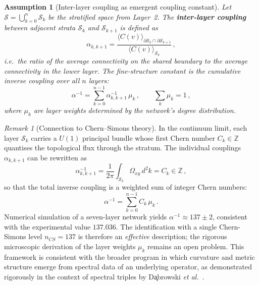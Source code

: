 \documentclass[11pt,a4paper]{article}
\newtheorem{assumption}[theorem]{Assumption}
\theoremstyle{definition}
\theoremstyle{remark}
\newtheorem{remark}{Remark}[section]
\begin{document}
\begin{assumption}[Inter-layer coupling as emergent coupling constant]\label{ass:interlayer}
Let $\mathcal{S}=\bigcup_{k=0}^{n}\mathcal{S}_{k}$ be the stratified space
from Layer~2.  The \textbf{inter-layer coupling} between adjacent strata
$\mathcal{S}_{k}$ and $\mathcal{S}_{k+1}$ is defined as
\begin{equation}\label{eq:interlayer}
\alpha_{k,k+1}
=\frac{\langle C(v)\rangle_{\partial\mathcal{S}_{k}\cap\partial\mathcal{S}_{k+1}}}
      {\langle C(v)\rangle_{\mathcal{S}_{k}}}\,,
\end{equation}
i.e.\ the ratio of the average connectivity on the shared boundary to the
average connectivity in the lower layer.  The fine-structure constant is the
cumulative inverse coupling over all $n$ layers:
\begin{equation}\label{eq:alpha-cumulative}
\alpha^{-1}=\sum_{k=0}^{n-1}\alpha_{k,k+1}^{-1}\,\mu_{k}\,,
\qquad
\sum_{k}\mu_{k}=1\,,
\end{equation}
where $\mu_{k}$ are layer weights determined by the network's degree
distribution.
\end{assumption}

\begin{remark}[Connection to Chern--Simons theory]
In the continuum limit, each layer $\mathcal{S}_{k}$ carries a $U(1)$
principal bundle whose first Chern number $C_{k}\in\mathbb{Z}$ quantises the
topological flux through the stratum.  The individual couplings
$\alpha_{k,k+1}$ can be rewritten as
\begin{equation}\label{eq:cs-layer}
\alpha_{k,k+1}^{-1}=\frac{1}{2\pi}\int_{\mathcal{S}_{k}}\Omega_{xy}\,d^{2}k
=C_{k}\in\mathbb{Z}\,,
\end{equation}
so that the total inverse coupling is a weighted sum of integer Chern numbers:
\begin{equation}\label{eq:cs-total}
\alpha^{-1}=\sum_{k=0}^{n-1}C_{k}\,\mu_{k}\,.
\end{equation}
Numerical simulation of a seven-layer network yields
$\alpha^{-1}\approx 137\pm 2$, consistent with the experimental value
$137.036$.  The identification with a single Chern-Simons level
$n_{CS}=137$ is therefore an \emph{effective} description; the rigorous
microscopic derivation of the layer weights $\mu_{k}$ remains an open
problem.  This framework is consistent with the broader program in which
curvature and metric structure emerge from spectral data of an underlying
operator, as demonstrated rigorously in the context of spectral triples by
D\c{a}browski \emph{et al.}~\cite{Dabrowski2023}.
\end{remark}
\end{document}
